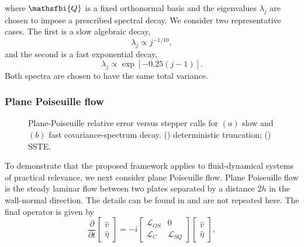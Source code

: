 where \(\mathsfbi{Q}\) is a fixed orthonormal basis and the eigenvalues \(\lambda_j\) are chosen to impose a prescribed spectral decay. We consider two representative cases. The first is a slow algebraic decay,
\begin{equation}
  \lambda_j
  \propto
  j^{-1/10},
  \label{eq:GL_slow_covariance_decay}
\end{equation}
and the second is a fast exponential decay,
\begin{equation}
  \lambda_j
  \propto
  \exp
  \left[
    -0.25(j-1)
  \right].
  \label{eq:GL_fast_covariance_decay}
\end{equation}
Both spectra are chosen to have the same total variance.
\subsubsection{Plane Poiseuille flow}
\label{sec:appendix_verification_poiseuille}
\begin{figure}[t]
    \centering
    \begin{minipage}[t]{0.49\textwidth}
        \centering
        \vspace{0pt}
        
    \end{minipage}
    \hfill
    \begin{minipage}[t]{0.49\textwidth}
        \centering
        \vspace{0pt}
        
    \end{minipage}
    \caption{Plane-Poiseuille relative error versus stepper calls for \((a)\) slow and \((b)\) fast covariance-spectrum decay. (\solidlegend) deterministic truncation; (\dashlegend\circlegend) SSTE.}
    \label{fig:Poiseuille_eig_vs_sste}
\end{figure}
To demonstrate that the proposed framework applies to fluid-dynamical systems of practical relevance, we next consider plane Poiseuille flow. Plane Poiseuille flow is the steady laminar flow between two plates separated by a distance \(2h\) in the wall-normal direction. The details can be found in \citet{schmid-henningson-2001} and are not repeated here.
The final operator is given by
\begin{equation}
  \frac{\partial}{\partial t}
  \begin{bmatrix}
    \hat{v}\\
    \hat{\eta}
  \end{bmatrix}
  =
  -i
  \begin{bmatrix}
    \mathcal{L}_{OS} & 0\\
    \mathcal{L}_{C} & \mathcal{L}_{SQ}
  \end{bmatrix}
  \begin{bmatrix}
    \hat{v}\\
    \hat{\eta}
  \end{bmatrix},
\end{equation}
